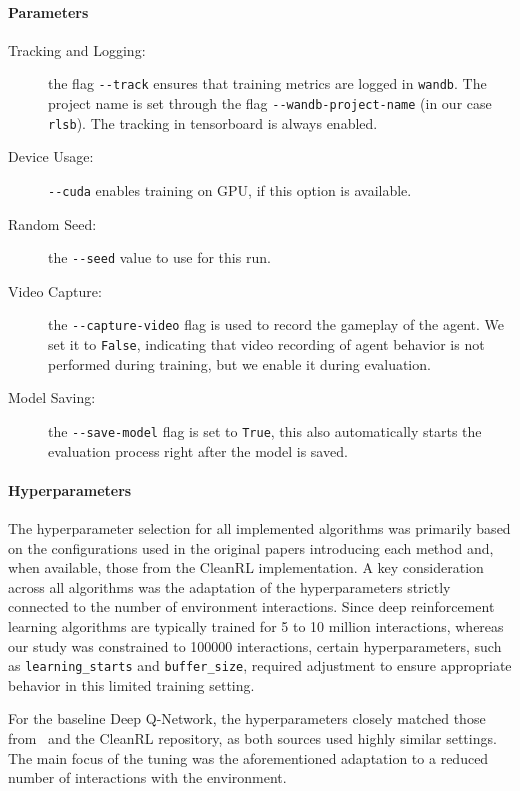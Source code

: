 \paragraph{Parameters}
\begin{description}
	\item[Tracking and Logging:] the flag \verb*|--track| ensures that training metrics are logged in \verb*|wandb|. The project name is set through the flag \verb*|--wandb-project-name| (in our case \texttt{rlsb}). The tracking in tensorboard is always enabled.
    \item[Device Usage:] \verb|--cuda| enables training on GPU, if this option is available.
	\item[Random Seed:] the \verb|--seed| value to use for this run.
	\item[Video Capture:] the \verb|--capture-video| flag is used to record the gameplay of the agent. We set it to \verb|False|, indicating that video recording of agent behavior is not performed during training, but we enable it during evaluation.
	\item[Model Saving:] the \verb|--save-model| flag is set to \verb|True|, this also automatically starts the evaluation process right after the model is saved.
\end{description}

\paragraph{Hyperparameters}
The hyperparameter selection for all implemented algorithms was primarily based on the configurations used in the original papers introducing each method and, when available, those from the CleanRL implementation. A key consideration across all algorithms was the adaptation of the hyperparameters strictly connected to the number of environment interactions. Since deep reinforcement learning algorithms are typically trained for 5 to 10 million interactions, whereas our study was constrained to \num{100000} interactions, certain hyperparameters, such as \texttt{learning\_starts} and \texttt{buffer\_size}, required adjustment to ensure appropriate behavior in this limited training setting.

For the baseline Deep Q-Network, the hyperparameters closely matched those from~\cite{mnih:human} and the CleanRL repository, as both sources used highly similar settings. The main focus of the tuning was the aforementioned adaptation to a reduced number of interactions with the environment.

